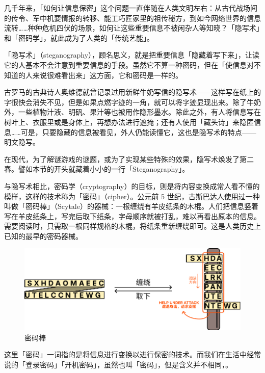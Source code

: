 几千年来，「如何让信息保密」这个问题一直伴随在人类文明左右：从古代战场间的传令、军中机要情报的转移、能工巧匠家里的祖传秘方，到如今网络世界的信息流转……种种危机四伏的场景，如何让这些重要信息不被闲杂人等知晓？「隐写术」和「密码学」，就此成为了人类的「传统艺能」。

「隐写术」（steganography），顾名思义，就是把重要信息「隐藏着写下来」，让读它的人基本不会注意到重要信息的手段。虽然它不算一种密码，但在「使信息对不知道的人来说很难看出来」这方面，它和密码是一样的。

古罗马的古典诗人奥维德就曾记录过用新鲜牛奶写信的隐写术——这样写在纸上的字很快会消失不见，但是如果点燃字迹的一角，就可以将字迹显现出来。除了牛奶外，一些植物汁液、明矾、果汁等也被用作隐形墨水。除此之外，有人将信息写在树叶上、衣服里或是身体上，再想办法进行遮掩；还有人使用「藏头诗」来隐匿信息……可是，只要隐藏的信息被看见，外人仍能读懂它，这也是隐写术的特点——明文隐写。

\begin{note}
  在现代，为了解谜游戏的谜题，或为了实现某些特殊的效果，隐写术焕发了第二春。譬如本节的开头就藏着小小的一行「Steganography」。
\end{note}

与隐写术相比，密码学（cryptography）的目标，则是将内容变换成常人看不懂的模样，这样的技术称为「密码」（cipher）。公元前 5 世纪，古斯巴达人使用过一种叫做「密码棒」（Scytale）的器械：一根缠绕有羊皮纸条的木棍。人们把信息竖着写在羊皮纸条上，写完后取下纸条，字母顺序就被打乱，难以再看出原本的信息。需要阅读时，只需取一根同样规格的木棍，将纸条重新缠绕即可。这是人类历史上已知的最早的密码器械。

\begin{figure}[htb!]
  \centering
  \includegraphics[width=.95\textwidth]{assets/surpass/Scytale.pdf}
  \caption{密码棒}
  \label{fig:Scytale}
\end{figure}

\begin{note}
  这里「密码」一词指的是将信息进行变换以进行保密的技术。而我们在生活中经常说的「登录密码」「开机密码」，虽然也叫「密码」，但是含义并不相同，。
\end{note}

